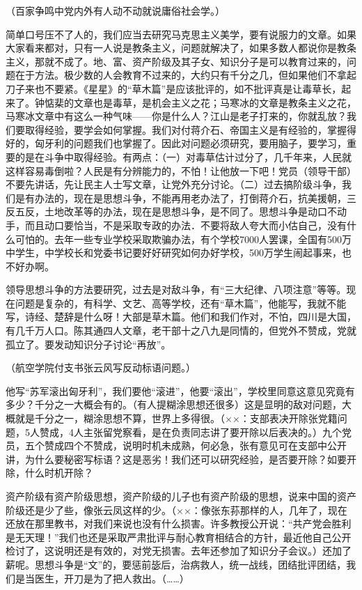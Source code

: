 （百家争鸣中党内外有人动不动就说庸俗社会学。）

简单口号压不了人的，我们应当去研究马克思主义美学，要有说服力的文章。如果大家看来都对，只有一人说是教条主义，问题就解决了，如果多数人都说你是教条主义，那就不成了。地、富、资产阶级及其子女、知识分子是可以教育过来的，问题在于方法。极少数的人会教育不过来的，大约只有千分之几，但如果他们不拿起刀子来也不要紧。《星星》的“草木篇”是应该批评的，如不批评真是让毒草长，起来了。钟惦棐的文章也是毒草，是机会主义之花；马寒冰的文章是教条主义之花，马寒冰文章中有这么一种气味——你是什么人？江山是老子打来的，你就乱放？我们要取得经验，要学会如何掌握。我们对付蒋介石、帝国主义是有经验的，掌握得好的，匈牙利的问题我们也掌握了。因此对问题必须研究，要用脑子，要学习，重要的是在斗争中取得经验。有两点：（一）对毒草估计过分了，几千年来，人民就这样容易毒倒啦？人民是有分辨能力的，不怕！让他放一下吧！党员（领导干部）不要先讲话，先让民主人士写文章，让党外充分讨论。（二）过去搞阶级斗争，我们是有办法的，现在是思想斗争，不能再用老办法了，打倒蒋介石，抗美援朝，三反五反，土地改革等的办法，现在是思想斗争，是不同了。思想斗争是动口不动手，而且动口要恰当，不是采取专政的办法．不要将敌人夸大而小估自己，没有什么可怕的。去年一些专业学校采取欺骗办法，有个学校7000人罢课，全国有500万中学生，中学校长和党委书记要好好研究如何办好学校，500万学生闹起事来，也不好办啊。

领导思想斗争的方法要研究，过去是对敌斗争，有“三大纪律、八项注意”等等。现在问题是复杂的，有科学、文艺、高等学校，还有“草木篇”，他能写，我就不能写，诗经、楚辞是什么呀！大部是草木篇。他们和我们作对，不怕，四川是大国，有几千万人口。陈其通四人文章，老干部十之八九是同情的，但党外不赞成，党就孤立了。要发动知识分子讨论“再放”。

（航空学院付支书张云风写反动标语问题。）

他写“苏军滚出匈牙利”，我们要他“滚进”，他要“滚出”，学校里同意这意见究竟有多少？千分之一大概会有的。（有人提糊涂思想还很多）这是显明的敌对问题，大概就是千分之一，糊涂思想不算，世界上多得很。（××：支部表决开除张党籍问题，5人赞成，4人主张留党察看，是在负责同志讲了要开除以后表决的。）九个党员，五个赞成四个不赞成，说明时机未成熟，何必急，张有意见可在支部中公开讲，为什么要秘密写标语？这是恶劣！我们还可以研究经验，是否要开除？如要开除，什么时机开除？

资产阶级有资产阶级思想，资产阶级的儿子也有资产阶级的思想，说来中国的资产阶级还是少了些，像张云凤这样的少。（××：像张东荪那样的人，几年了，现在还放在那里教书，对我们来说也没有什么损害。许多教授公开说：“共产党会胜利是无天理！”我们也还是采取严肃批评与耐心教育相结合的方针，最近他自己公开检讨了，这说明还是有效的，对党无损害。去年还参加了知识分子会议。）还加了薪呢。思想斗争是“文”的，要惩前毖后，治病救人，统一战线，团结批评团结，我们是当医生，开刀是为了把人救出。（……）

